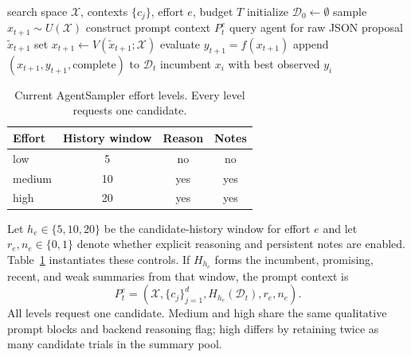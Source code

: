 \documentclass[letterpaper]{article}
\begin{document}
\begin{algorithm}[t]
\caption{Validated agent sampling}
\label{alg:sampler}
\begin{algorithmic}[1]
\REQUIRE search space $\mathcal{X}$, contexts $\{c_j\}$, effort $e$, budget $T$
\STATE initialize $\mathcal{D}_0\leftarrow\emptyset$
    \STATE sample $x_{t+1}\sim U(\mathcal{X})$
  \ELSE
    \STATE construct prompt context $P_t^e$
    \STATE query agent for raw JSON proposal $\tilde{x}_{t+1}$
    \STATE set $x_{t+1}\leftarrow V(\tilde{x}_{t+1};\mathcal{X})$
  \ENDIF
  \STATE evaluate $y_{t+1}=f(x_{t+1})$
  \STATE append $(x_{t+1},y_{t+1},\mathrm{complete})$ to $\mathcal{D}_{t}$
\ENDFOR
\RETURN incumbent $x_i$ with best observed $y_i$
\end{algorithmic}
\end{algorithm}

\begin{table}[t]
\centering
\begin{tabular}{lccc}
\toprule
Effort & History window & Reason & Notes \\
\midrule
low & 5 & no & no \\
medium & 10 & yes & yes \\
high & 20 & yes & yes \\
\bottomrule
\end{tabular}
\caption{Current AgentSampler effort levels. Every level requests one candidate.}
\label{tab:effort}
\end{table}

Let $h_e\in\{5,10,20\}$ be the candidate-history window for effort $e$ and
let $r_e,n_e\in\{0,1\}$ denote whether explicit reasoning and persistent notes
are enabled. Table~\ref{tab:effort} instantiates these controls. If $H_{h_e}$
forms the incumbent, promising, recent, and weak summaries from that window,
the prompt context is
\begin{equation}
  P_t^e = \left(\mathcal{X},\{c_j\}_{j=1}^{d},
  H_{h_e}(\mathcal{D}_t),r_e,n_e\right).
\end{equation}
All levels request one candidate. Medium and high share the same qualitative
prompt blocks and backend reasoning flag; high differs by retaining twice as
many candidate trials in the summary pool.
\end{document}
